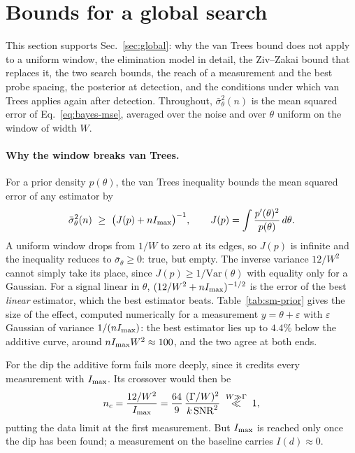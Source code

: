 \section{Bounds for a global search}
\label{sm:prior}

This section supports Sec.~\ref{sec:global}: why the van Trees bound does not apply to a uniform window, the
elimination model in detail, the Ziv--Zakai bound that replaces it, the two search bounds, the reach of a measurement and the best probe spacing,
the posterior at detection, and the conditions under which van Trees applies again after detection. Throughout,
$\bar\sigma_\theta^2(n)$ is the mean squared error of Eq.~\eqref{eq:bayes-mse}, averaged over the noise and over
$\theta$ uniform on the window of width $W$.

\paragraph{Why the window breaks van Trees.} For a prior density $p(\theta)$, the van Trees inequality
\cite{vantrees1968,gill1995} bounds the mean squared error of any estimator by
\begin{equation*}
  \bar\sigma_\theta^2(n)\ \ge\ \big(J(p)+nI_{\rm max}\big)^{-1},\qquad
  J(p)=\int\frac{p'(\theta)^2}{p(\theta)}\,d\theta .
\end{equation*}
A uniform window drops from $1/W$ to zero at its edges, so $J(p)$ is infinite and the inequality reduces to
$\bar\sigma_\theta\ge0$: true, but empty. The inverse variance $12/W^2$ cannot simply take its place, since
$J(p)\ge1/\mathrm{Var}(\theta)$ with equality only for a Gaussian. For a signal linear in $\theta$,
$(12/W^2+nI_{\rm max})^{-1/2}$ is the error of the best \emph{linear} estimator, which the best estimator beats.
Table~\ref{tab:sm-prior} gives the size of the effect, computed numerically for a measurement
$y=\theta+\varepsilon$ with $\varepsilon$ Gaussian of variance $1/(nI_{\rm max})$: the best estimator lies up to
$4.4\%$ below the additive curve, around $nI_{\rm max}W^2\approx100$, and the two agree at both ends.

For the dip the additive form fails more deeply, since it credits every measurement with $I_{\rm max}$. Its
crossover would then be
\begin{equation*}
  n_c=\frac{12/W^2}{I_{\rm max}}=\frac{64}{9}\,\frac{(\Gamma/W)^2}{k\,\mathrm{SNR}^2}
  \;\overset{W\gg\Gamma}{\ll}\;1,
\end{equation*}
putting the data limit at the first measurement. But $I_{\rm max}$ is reached only once the dip has been found; a
measurement on the baseline carries $I(d)\approx0$.


